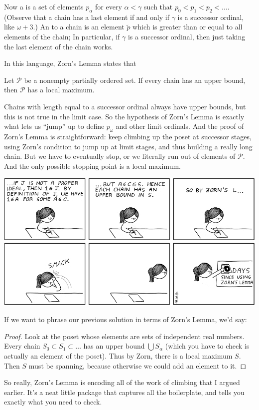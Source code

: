 Now a  is a set of elements $p_\alpha$ for every $\alpha < \gamma$
such that $p_0 < p_1 < p_2 < \dots$.
(Observe that a chain has a last element if and only if $\gamma$ is a successor ordinal, like $\omega+3$.)
An  to a chain is an element $\tilde p$ which is greater than or equal
to all elements of the chain;
In particular, if $\gamma$ is a successor ordinal, then just taking the last element of the chain works.

In this language, Zorn's Lemma states that
\begin{theorem}
	Let $\mathcal P$ be a nonempty partially ordered set.
	If every chain has an upper bound,
	then $\mathcal P$ has a local maximum.
\end{theorem}

Chains with length equal to a successor ordinal always have upper bounds,
but this is not true in the limit case.
So the hypothesis of Zorn's Lemma is exactly what
lets us ``jump'' up to define $p_\omega$ and other limit ordinals.
And the proof of Zorn's Lemma is straightforward: keep climbing up the poset at successor stages,
using Zorn's condition to jump up at limit stages, and thus building a really long chain.
But we have to eventually stop, or we literally run out of elements of $\mathcal P$.
And the only possible stopping point is a local maximum.

\begin{center}
	\includegraphics[scale=0.5]{media/zornaholic.png}
\end{center}

If we want to phrase our previous solution in terms of Zorn's Lemma, we'd say:
\begin{proof}
	Look at the poset whose elements are sets of independent real numbers.
	Every chain $S_0 \subset S_1 \subset \dots$ has an upper bound $\bigcup S_\alpha$
	(which you have to check is actually an element of the poset).
	Thus by Zorn, there is a local maximum $S$.
	Then $S$ must be spanning, because otherwise we could add an element to it.
\end{proof}
So really, Zorn's Lemma is encoding all of the work of climbing that I argued earlier.
It's a neat little package that captures all the boilerplate, and tells
you exactly what you need to check.

